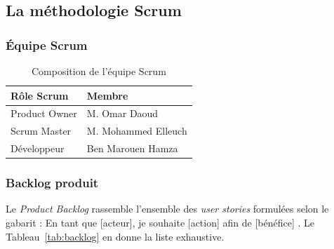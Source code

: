 \subsection{La méthodologie Scrum}

\subsubsection{Équipe Scrum}

\begin{table}[H]
    \centering
    \caption{Composition de l'équipe Scrum}
    \label{tab:equipe_scrum}
    \begin{tabular}{|l|l|}
        \hline
        \textbf{Rôle Scrum} & \textbf{Membre} \\
        \hline
        Product Owner & M. Omar Daoud \\
        \hline
        Scrum Master & M. Mohammed Elleuch \\
        \hline
        Développeur & Ben Marouen Hamza \\
        \hline
    \end{tabular}
\end{table}

\subsubsection{Backlog produit}

Le \textit{Product Backlog} rassemble l'ensemble des \textit{user stories} formulées selon le gabarit : \og En tant que [acteur], je souhaite [action] afin de [bénéfice] \fg{}. Le Tableau~\ref{tab:backlog} en donne la liste exhaustive.

